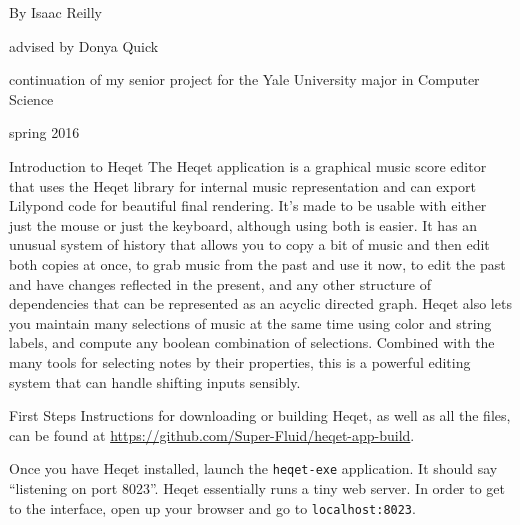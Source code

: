 \documentclass{article}
\begin{document}
\pagestyle{empty}
\begin{center}
\vspace{3cm}

\vspace{2cm}
{\Large By Isaac Reilly}

\vspace{0.15cm}
{\large advised by Donya Quick}

\vspace{0.1cm}
{continuation of my senior project for the Yale University major in Computer Science}

\vspace{13cm}

{\small spring 2016}

\end{center}

\pagebreak

\tableofcontents
\newpage
\pagestyle{plain}

\begin{section}{Introduction to Heqet}
The Heqet application is a graphical music score editor that uses the Heqet library for internal music representation and can export Lilypond code for beautiful final rendering. It's made to be usable with either just the mouse or just the keyboard, although using both is easier. It has an unusual system of history that allows you to copy a bit of music and then edit both copies at once, to grab music from the past and use it now, to edit the past and have changes reflected in the present, and any other structure of dependencies that can be represented as an acyclic directed graph. Heqet also lets you maintain many selections of music at the same time using color and string labels, and compute any boolean combination of selections. Combined with the many tools for selecting notes by their properties, this is a powerful editing system that can handle shifting inputs sensibly.

\end{section}

\begin{section}{First Steps}
Instructions for downloading or building Heqet, as well as all the files, can be found at \url{https://github.com/Super-Fluid/heqet-app-build}.

Once you have Heqet installed, launch the \texttt{heqet-exe} application. It should say ``listening on port 8023''. Heqet essentially runs a tiny web server. In order to get to the interface, open up your browser and go to \texttt{localhost:8023}.
\end{section}
\end{document}
